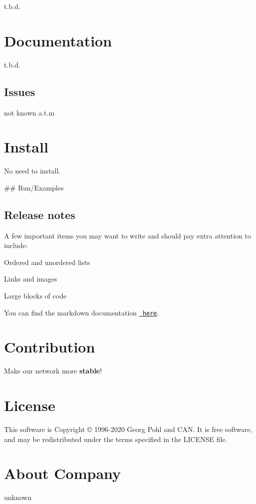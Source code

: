 t.\+b.\+d.

\section*{Documentation}

t.\+b.\+d.

\subsection*{Issues}

not known a.\+t.\+m

\section*{Install}

No need to {\ttfamily install}.

\#\# Run/\+Examples 
\begin{DoxyCode}{0}
\end{DoxyCode}


\subsection*{Release notes}

A few important items you may want to write and should pay extra attention to include\+:


\begin{DoxyItemize}
\item Ordered and unordered lists
\item Links and images
\item Large blocks of code
\end{DoxyItemize}

You can find the markdown documentation \href{https://docs.github.com/en/free-pro-team@latest/github/writing-on-github}{\texttt{ here}}.

\section*{Contribution}

Make our network more {\bfseries{stable}}!

\section*{License}

This software is Copyright © 1996-\/2020 Georg Pohl and C\+AN. It is free software, and may be redistributed under the terms specified in the L\+I\+C\+E\+N\+SE file.

\section*{About \textquotesingle{}Company\textquotesingle{}}

unknown 